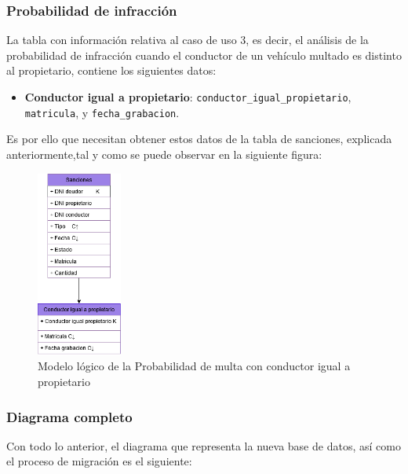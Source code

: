 \documentclass[]{article}
\begin{document}
\subsubsection{Probabilidad de infracción}

La tabla con información relativa al caso de uso 3, es decir, el análisis de la probabilidad de infracción cuando el conductor de un vehículo multado es distinto al propietario, contiene los siguientes datos: 
\begin{itemize}
    \item\textbf{Conductor igual a propietario}: \verb!conductor_igual_propietario!, \verb!matricula!, y \verb!fecha_grabacion!.
\end{itemize}

Es por ello que necesitan obtener estos datos de la tabla de sanciones, explicada anteriormente,tal y como se puede observar en la siguiente figura:

\begin{figure}[H]
    \centering
    \includegraphics[width=0.25\textwidth]{./imagenes/conductores.png}
    \caption{Modelo lógico de la Probabilidad de multa con conductor igual a propietario}
\end{figure}

\subsubsection{Diagrama completo}

Con todo lo anterior, el diagrama que representa la nueva base de datos, así como el proceso de migración es el siguiente:

\end{document}
